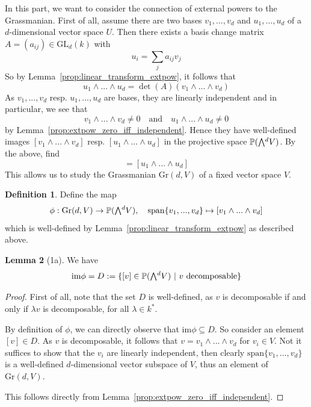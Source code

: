 \documentclass{scrartcl}
\newcommand{\Proj}{\mathbb{P}}
\newcommand{\GL}{\mathrm{GL}}
\newcommand{\Gr}{\mathrm{Gr}}
\newcommand{\extpow}{\mathchoice{{\textstyle\bigwedge}}
    {{\bigwedge}}
    {{\textstyle\wedge}}
    {{\scriptstyle\wedge}}}
\newcommand{\vspan}{\mathrm{span}}
\theoremstyle{definition}
\newtheorem{definition}{Definition}
\newtheorem{lemma}[definition]{Lemma}
\begin{document}
In this part, we want to consider the connection of external powers to the Grassmanian.
First of all, assume there are two bases $v_1, ..., v_d$ and $u_1, ..., u_d$ of a $d$-dimensional vector space $U$. 
Then there exists a basis change matrix $A = (a_{ij}) \in \GL_d(k)$ with
\begin{equation*}
    u_i = \sum_j a_{ij} v_j
\end{equation*}
So by Lemma~\ref{prop:linear_transform_extpow}, it follows that
\begin{equation*}
    u_1 \wedge ... \wedge u_d = \det(A) (v_1 \wedge ... \wedge v_d)
\end{equation*}
As $v_1, ..., v_d$ resp. $u_1, ..., u_d$ are bases, they are linearly independent and in particular, we see that
\begin{equation*}
    v_1 \wedge ... \wedge v_d \neq 0 \quad \text{and} \quad u_1 \wedge ... \wedge u_d \neq 0
\end{equation*}
by Lemma~\ref{prop:extpow_zero_iff_independent}.
Hence they have well-defined images $[v_1 \wedge ... \wedge v_d]$ resp. $[u_1 \wedge ... \wedge u_d]$ in the projective space $\Proj(\extpow^d V)$.
By the above, find
\begin{equation*}
    [v_1 \wedge ... \wedge v_d] = [u_1 \wedge ... \wedge u_d]
\end{equation*}
This allows us to study the Grassmanian $\Gr(d, V)$ of a fixed vector space $V$.
\begin{definition}
    Define the map
    \begin{equation*}
        \phi: \Gr(d, V) \to \Proj(\extpow^d V), \quad \vspan\{v_1, ..., v_d\} \mapsto [v_1 \wedge ... \wedge v_d]
    \end{equation*}
    which is well-defined by Lemma~\ref{prop:linear_transform_extpow} as described above.
\end{definition}
\begin{lemma}[1a]
    We have
    \begin{equation*}
        \mathrm{im}\phi = D := \{ [v] \in \Proj(\extpow^d V) \ | \ \text{$v$ decomposable}\}
    \end{equation*}
\end{lemma}
\begin{proof}
    First of all, note that the set $D$ is well-defined, as $v$ is decomposable if and only if $\lambda v$ is decomposable, for all $\lambda \in k^*$.

    By definition of $\phi$, we can directly observe that $\mathrm{im}\phi \subseteq D$.
    So consider an element $[v] \in D$.
    As $v$ is decomposable, it follows that $v = v_1 \wedge ... \wedge v_d$ for $v_i \in V$.
    Not it suffices to show that the $v_i$ are linearly independent, then clearly $\vspan\{v_1, ..., v_d\}$ is a well-defined $d$-dimensional vector subspace of $V$, thus an element of $\Gr(d, V)$.

    This follows directly from Lemma~\ref{prop:extpow_zero_iff_independent}.
\end{proof}
\end{document}
